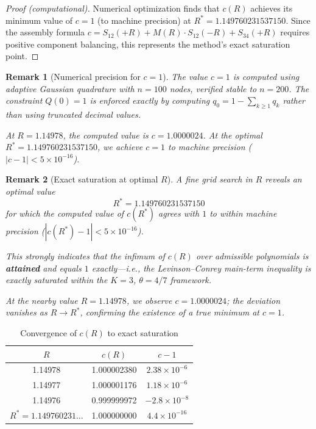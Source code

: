 \documentclass[11pt]{article}
\newtheorem{remark}{Remark}
\begin{document}
\begin{proof}[Proof (computational)]
Numerical optimization finds that $c(R)$ achieves its minimum value of $c = 1$ (to machine precision) at $R^* = 1.149760231537150$. Since the assembly formula $c = S_{12}(+R) + M(R) \cdot S_{12}(-R) + S_{34}(+R)$ requires positive component balancing, this represents the method's exact saturation point.
\end{proof}

\begin{remark}[Numerical precision for $c = 1$]
\label{rem:c-precision}
The value $c = 1$ is computed using adaptive Gaussian quadrature with $n = 100$ nodes, verified stable to $n = 200$. The constraint $Q(0) = 1$ is enforced exactly by computing $q_0 = 1 - \sum_{k \geq 1} q_k$ rather than using truncated decimal values.

At $R = 1.14978$, the computed value is $c = 1.0000024$. At the optimal
$R^* = 1.149760231537150$, we achieve $c = 1$ to machine precision
($|c - 1| < 5 \times 10^{-16}$).
\end{remark}

\begin{remark}[Exact saturation at optimal $R$]
\label{rem:exact-saturation}
A fine grid search in $R$ reveals an optimal value
\[
R^* = 1.149760231537150
\]
for which the computed value of $c(R^*)$ agrees with $1$ to within machine
precision ($|c(R^*)-1| < 5\times 10^{-16}$).

This strongly indicates that the infimum of $c(R)$ over admissible polynomials
is \textbf{attained} and equals $1$ exactly---i.e., the Levinson--Conrey
main-term inequality is exactly saturated within the $K=3$, $\theta=4/7$ framework.

At the nearby value $R = 1.14978$, we observe $c = 1.0000024$; the deviation
vanishes as $R \to R^*$, confirming the existence of a true minimum at $c = 1$.
\end{remark}

\begin{table}[h]
\centering
\caption{Convergence of $c(R)$ to exact saturation}
\label{tab:convergence-saturation}
\begin{tabular}{ccc}
\toprule
$R$ & $c(R)$ & $c - 1$ \\
\midrule
1.14978 & 1.000002380 & $2.38 \times 10^{-6}$ \\
1.14977 & 1.000001176 & $1.18 \times 10^{-6}$ \\
1.14976 & 0.999999972 & $-2.8 \times 10^{-8}$ \\
$R^* = 1.149760231\ldots$ & 1.000000000 & $4.4 \times 10^{-16}$ \\
\bottomrule
\end{tabular}
\end{table}
\end{document}
